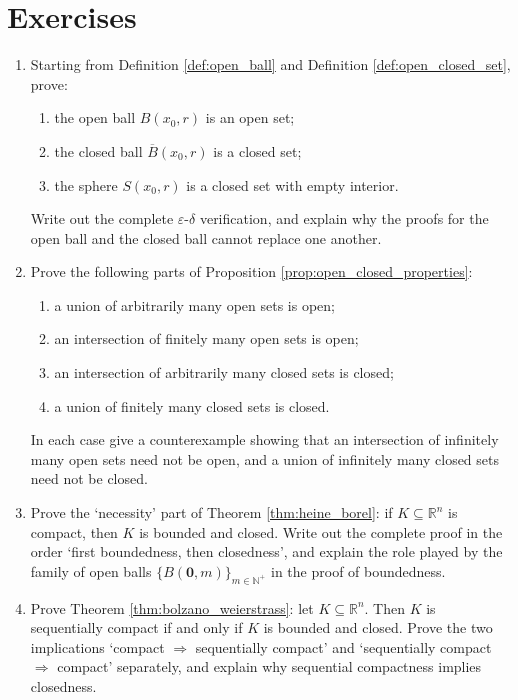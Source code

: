 \section*{Exercises}

\begin{enumerate}[leftmargin=3em, label=\textbf{Exercise \arabic*}]

    \item Starting from Definition \ref{def:open_ball} and Definition \ref{def:open_closed_set}, prove:
    \begin{enumerate}[label=(\roman*)]
        \item the open ball $B(x_0,r)$ is an open set;
        \item the closed ball $\overline{B}(x_0,r)$ is a closed set;
        \item the sphere $S(x_0,r)$ is a closed set with empty interior.
    \end{enumerate}
    Write out the complete $\varepsilon$-$\delta$ verification, and explain why the proofs for the open ball and the closed ball cannot replace one another.

    \item Prove the following parts of Proposition \ref{prop:open_closed_properties}:
    \begin{enumerate}[label=(\roman*)]
        \item a union of arbitrarily many open sets is open;
        \item an intersection of finitely many open sets is open;
        \item an intersection of arbitrarily many closed sets is closed;
        \item a union of finitely many closed sets is closed.
    \end{enumerate}
    In each case give a counterexample showing that an intersection of infinitely many open sets need not be open, and a union of infinitely many closed sets need not be closed.

    \item Prove the `necessity' part of Theorem \ref{thm:heine_borel}:
    if $K \subseteq \mathbb{R}^n$ is compact, then $K$ is bounded and closed.
    Write out the complete proof in the order `first boundedness, then closedness',
    and explain the role played by the family of open balls $\{B(\mathbf{0},m)\}_{m\in\mathbb{N}^+}$ in the proof of boundedness.

    \item Prove Theorem \ref{thm:bolzano_weierstrass}:
    let $K \subseteq \mathbb{R}^n$. Then $K$ is sequentially compact if and only if $K$ is bounded and closed.
    Prove the two implications `compact $\Rightarrow$ sequentially compact' and `sequentially compact $\Rightarrow$ compact' separately,
    and explain why sequential compactness implies closedness.


\end{enumerate}
